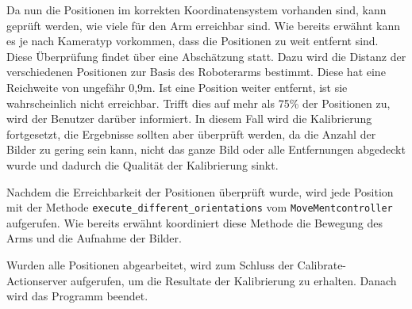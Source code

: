 Da nun die Positionen im korrekten Koordinatensystem vorhanden sind, kann geprüft werden, wie viele für den Arm erreichbar sind. Wie bereits erwähnt kann es je nach Kameratyp vorkommen, dass die Positionen zu weit entfernt sind. Diese Überprüfung findet über eine Abschätzung statt. Dazu wird die Distanz der verschiedenen Positionen zur Basis des Roboterarms bestimmt. Diese hat eine Reichweite von ungefähr 0,9m. Ist eine Position weiter entfernt, ist sie wahrscheinlich nicht erreichbar. Trifft dies auf mehr als 75\% der Positionen zu, wird der Benutzer darüber informiert. In diesem Fall wird die Kalibrierung fortgesetzt, die Ergebnisse sollten aber überprüft werden, da die Anzahl der Bilder zu gering sein kann, nicht das ganze Bild oder alle Entfernungen abgedeckt wurde und dadurch die Qualität der Kalibrierung sinkt.

Nachdem die Erreichbarkeit der Positionen überprüft wurde, wird jede Position mit der Methode \texttt{execute\_different\_orientations} vom \texttt{MoveMentcontroller} aufgerufen. Wie bereits erwähnt koordiniert diese Methode die Bewegung des Arms und die Aufnahme der Bilder.

Wurden alle Positionen abgearbeitet, wird zum Schluss der Calibrate-Actionserver aufgerufen, um die Resultate der Kalibrierung zu erhalten. Danach wird das Programm beendet. 